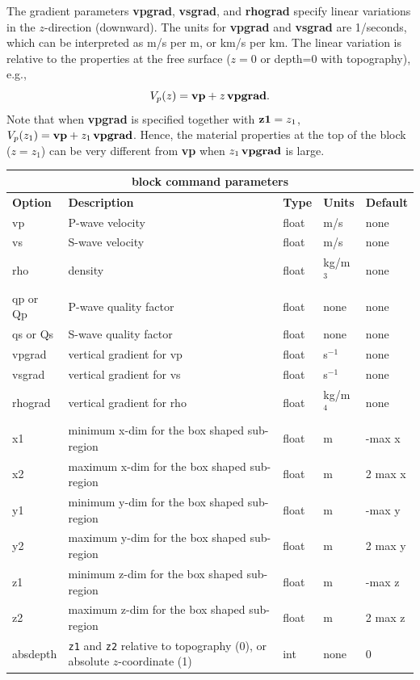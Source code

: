 \documentclass[11pt]{report}
\begin{document}
The gradient parameters {\bf vpgrad}, {\bf vsgrad}, and {\bf rhograd} specify linear variations in the
$z$-direction (downward). The units for {\bf vpgrad} and {\bf vsgrad} are 1/seconds, which
can be interpreted as m/s per m, or km/s per km. The linear variation is relative to the properties at
the free surface ($z=0$ or depth=0 with topography), e.g.,
\[
V_p(z) = {\bf vp} + z \, {\bf vpgrad}.
\]
Note that when {\bf vpgrad} is specified together with ${\bf z1}=z_1$, $V_p(z_1) = {\bf vp} + z_1\,
{\bf vpgrad}$. Hence, the material properties at the top of the block ($z=z_1$) can be very
different from {\bf vp} when $z_1\, {\bf vpgrad}$ is large.
\begin{center}
\begin{tabular}{|l|p{8cm}|l|l|l|} \hline
\multicolumn{5}{|c|}{\bf block command parameters}\\ \hline
{\bf Option} & {\bf Description}          & {\bf Type} & {\bf Units} & {\bf Default} \\ \hline 
\hline
vp          & P-wave velocity           & float     & m/s      & none \\ \hline
vs          & S-wave velocity           & float     & m/s      & none \\ \hline
rho         & density                   & float     & kg/m$^3$ & none \\ \hline
qp or Qp    & P-wave quality factor     & float     & none     & none \\ \hline
qs or Qs    & S-wave quality factor     & float     & none     & none \\ \hline
vpgrad      & vertical gradient for vp  & float     & s$^{-1}$  & none \\ \hline
vsgrad      & vertical gradient for vs  & float     & s$^{-1}$  & none \\ \hline
rhograd     & vertical gradient for rho & float     & kg/m$^4$  & none \\ \hline
x1          & minimum x-dim for the box shaped sub-region & float & m & -max x \\ \hline
x2          & maximum x-dim for the box shaped sub-region & float & m & 2 max x \\ \hline
\hline
y1          & minimum y-dim for the box shaped sub-region & float & m & -max y \\ \hline
y2          & maximum y-dim for the box shaped sub-region & float & m & 2 max y \\ \hline
\hline
z1          & minimum z-dim for the box shaped sub-region & float & m & -max z \\ \hline
z2          & maximum z-dim for the box shaped sub-region & float & m & 2 max z \\ \hline
\hline
absdepth    & {\tt z1} and {\tt z2} relative to topography (0), or absolute $z$-coordinate (1) & int
& none & 0 \\ \hline 
\end{tabular}
\end{center}
\end{document}
